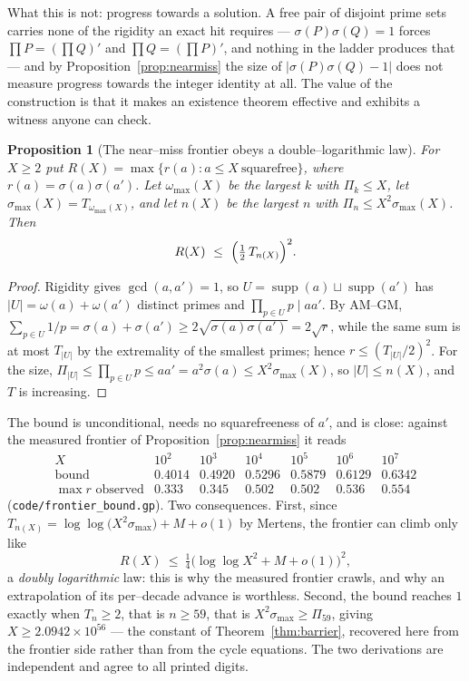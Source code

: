 \documentclass[11pt]{article}
\newtheorem{proposition}[theorem]{Proposition}
\theoremstyle{definition}
\begin{document}
What this is not: progress towards a solution. A free pair of disjoint prime sets carries none of
the rigidity an exact hit requires --- $\sigma(P)\sigma(Q)=1$ forces $\prod P=(\prod Q)'$ and
$\prod Q=(\prod P)'$, and nothing in the ladder produces that --- and by
Proposition~\ref{prop:nearmiss} the size of $|\sigma(P)\sigma(Q)-1|$ does not measure progress
towards the integer identity at all. The value of the construction is that it makes an existence
theorem effective and exhibits a witness anyone can check.

\begin{proposition}[The near--miss frontier obeys a double--logarithmic law]\label{prop:frontier}
For $X\ge2$ put $R(X)=\max\{r(a):a\le X\ \text{squarefree}\}$, where $r(a)=\sigma(a)\sigma(a')$. Let
$\omega_{\max}(X)$ be the largest $k$ with $\Pi_k\le X$, let $\sigma_{\max}(X)=T_{\omega_{\max}(X)}$,
and let $n(X)$ be the largest $n$ with $\Pi_n\le X^{2}\sigma_{\max}(X)$. Then
\[ R(X)\ \le\ \Bigl(\tfrac12\,T_{n(X)}\Bigr)^{2}. \]
\end{proposition}
\begin{proof}
Rigidity gives $\gcd(a,a')=1$, so $U=\operatorname{supp}(a)\sqcup\operatorname{supp}(a')$ has
$|U|=\omega(a)+\omega(a')$ distinct primes and $\prod_{p\in U}p\mid aa'$. By AM--GM,
$\sum_{p\in U}1/p=\sigma(a)+\sigma(a')\ge2\sqrt{\sigma(a)\sigma(a')}=2\sqrt{r}$, while the same sum
is at most $T_{|U|}$ by the extremality of the smallest primes; hence $r\le(T_{|U|}/2)^{2}$. For the
size, $\Pi_{|U|}\le\prod_{p\in U}p\le aa'=a^{2}\sigma(a)\le X^{2}\sigma_{\max}(X)$, so
$|U|\le n(X)$, and $T$ is increasing.
\end{proof}

The bound is unconditional, needs no squarefreeness of $a'$, and is close: against the measured
frontier of Proposition~\ref{prop:nearmiss} it reads
\[
\begin{array}{l|cccccc}
X & 10^{2} & 10^{3} & 10^{4} & 10^{5} & 10^{6} & 10^{7}\\\hline
\text{bound} & 0.4014 & 0.4920 & 0.5296 & 0.5879 & 0.6129 & 0.6342\\
\max r \text{ observed} & 0.333 & 0.345 & 0.502 & 0.502 & 0.536 & 0.554
\end{array}
\]
\textup{(\texttt{code/frontier\_bound.gp})}. Two consequences. First, since
$T_{n(X)}=\log\log\bigl(X^{2}\sigma_{\max}\bigr)+M+o(1)$ by Mertens, the frontier can climb only like
\[ R(X)\ \le\ \tfrac14\bigl(\log\log X^{2}+M+o(1)\bigr)^{2}, \]
a \emph{doubly logarithmic} law: this is why the measured frontier crawls, and why an extrapolation
of its per--decade advance is worthless. Second, the bound reaches $1$ exactly when $T_{n}\ge2$, that
is $n\ge59$, that is $X^{2}\sigma_{\max}\ge\Pi_{59}$, giving $X\ge2.0942\times10^{56}$ --- the
constant of Theorem~\ref{thm:barrier}, recovered here from the frontier side rather than from the
cycle equations. The two derivations are independent and agree to all printed digits.
\end{document}
